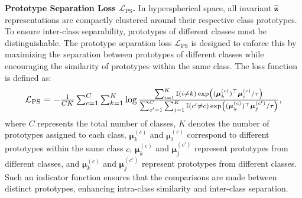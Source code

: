 \noindent\textbf{Prototype Separation Loss $\mathcal{L}_{\mathrm{PS}}$.} 
In hyperspherical space, all invariant $\hat{\mathbf{z}}$ representations are compactly clustered around their respective class prototypes. To ensure inter-class separability, prototypes of different classes must be distinguishable. The prototype separation loss $\mathcal{L}_{\text{PS}}$ is designed to enforce this by maximizing the separation between prototypes of different classes while encouraging the similarity of prototypes within the same class. The loss function is defined as:
\begin{equation}\label{ps}
\resizebox{.9\hsize}{!}{$
    \mathcal{L}_{\text{PS}} = -\frac{1}{CK} \sum_{c=1}^{C} \sum_{k=1}^{K} \log \frac{\sum_{i = 1}^{K} \mathbb{I}(i \neq k) \exp \left( {(\boldsymbol{\mu}_{k}^{(c)})^\top \boldsymbol{\mu}_{i}^{(c)}}/{\tau} \right)}{\sum_{c' = 1}^{C} \sum_{j = 1}^{K} \mathbb{I}(c' \neq c) \exp \left( {(\boldsymbol{\mu}_{k}^{(c)})^\top \boldsymbol{\mu}_{j}^{(c')}}/{\tau} \right)},$}
\end{equation}
where $C$ represents the total number of classes, $K$ denotes the number of prototypes assigned to each class, $\boldsymbol{\mu}_{k}^{(c)}$ and $\boldsymbol{\mu}_i^{(c)}$ correspond to different prototypes within the same class $c$,
$\boldsymbol{\mu}_{k}^{(c)}$ and $\boldsymbol{\mu}_j^{(c')}$ represent prototypes from different classes, and $\boldsymbol{\mu}_{k}^{(c)}$ and $\boldsymbol{\mu}_j^{(c')}$ represent prototypes from different classes. Such an indicator function ensures that the comparisons are made between distinct prototypes, enhancing intra-class similarity and inter-class separation.

